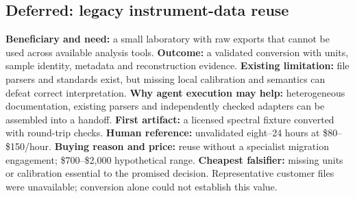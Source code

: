 \subsection{Deferred: legacy instrument-data reuse}
\textbf{Beneficiary and need:} a small laboratory with raw exports that cannot be used across available analysis tools. \textbf{Outcome:} a validated conversion with units, sample identity, metadata and reconstruction evidence. \textbf{Existing limitation:} file parsers and standards exist, but missing local calibration and semantics can defeat correct interpretation. \textbf{Why agent execution may help:} heterogeneous documentation, existing parsers and independently checked adapters can be assembled into a handoff. \textbf{First artifact:} a licensed spectral fixture converted with round-trip checks. \textbf{Human reference:} unvalidated eight--24 hours at \$80--\$150/hour. \textbf{Buying reason and price:} reuse without a specialist migration engagement; \$700--\$2,000 hypothetical range. \textbf{Cheapest falsifier:} missing units or calibration essential to the promised decision. Representative customer files were unavailable; conversion alone could not establish this value.

